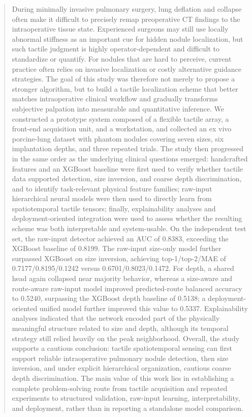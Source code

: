 \begin{abstract}
During minimally invasive pulmonary surgery, lung deflation and collapse often make it difficult to precisely remap preoperative CT findings to the intraoperative tissue state. Experienced surgeons may still use locally abnormal stiffness as an important cue for hidden nodule localization, but such tactile judgment is highly operator-dependent and difficult to standardize or quantify. For nodules that are hard to perceive, current practice often relies on invasive localization or costly alternative guidance strategies. The goal of this study was therefore not merely to propose a stronger algorithm, but to build a tactile localization scheme that better matches intraoperative clinical workflow and gradually transforms subjective palpation into measurable and quantitative inference. We constructed a prototype system composed of a flexible tactile array, a front-end acquisition unit, and a workstation, and collected an ex vivo porcine-lung dataset with phantom nodules covering seven sizes, six implantation depths, and three repeated trials. The study then progressed in the same order as the underlying clinical questions emerged: handcrafted features and an XGBoost baseline were first used to verify whether tactile data supported detection, size inversion, and coarse depth discrimination, and to identify task-relevant physical feature families; raw-input hierarchical neural models were then used to directly learn from spatiotemporal tactile tensors; finally, explainability analyses and deployment-oriented integration were used to assess whether the resulting scheme was both interpretable and system-usable. On the independent test set, the raw-input detector achieved an AUC of 0.8383, exceeding the XGBoost baseline of 0.8199. The raw-input size-only model further surpassed XGBoost on size inversion, achieving top-1/top-2/MAE of 0.7177/0.8195/0.1242 versus 0.6701/0.8023/0.1472. For depth, a shared head again collapsed near majority behavior, whereas a size-aware and route-aware raw-input model improved predicted-route balanced accuracy to 0.5240, surpassing the XGBoost depth baseline of 0.5138; a deployment-oriented unified model further improved this value to 0.5337. Explainability analyses indicated that the network encoded part of the physically meaningful structure related to size and depth, although its temporal strategy still relied heavily on the peak neighborhood. Overall, the study supports a cautious conclusion: tactile spatiotemporal sensing can first support reliable intraoperative pulmonary nodule detection, then size inversion, and under explicit hierarchical organization, cautious coarse depth discrimination. The main value of this work lies in establishing a complete problem-solving route from tactile acquisition and repeated experiments to structured validation, raw-input learning, interpretability, and deployment, rather than in reporting a standalone model comparison.
\end{abstract}
